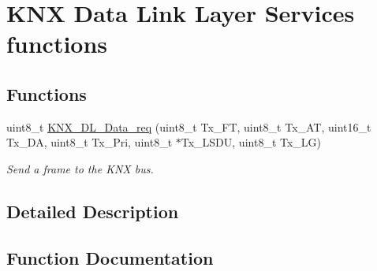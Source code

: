 \hypertarget{group___k_n_x___d_l___exported___functions___group2}{}\section{K\+NX Data Link Layer Services functions}
\label{group___k_n_x___d_l___exported___functions___group2}
\subsection*{Functions}
\begin{DoxyCompactItemize}
\item 
uint8\+\_\+t \hyperlink{group___k_n_x___d_l___exported___functions___group2_ga92e01d8fd06b0e629413b1b2316d88df}{K\+N\+X\+\_\+\+D\+L\+\_\+\+Data\+\_\+req} (uint8\+\_\+t Tx\+\_\+\+FT, uint8\+\_\+t Tx\+\_\+\+AT, uint16\+\_\+t Tx\+\_\+\+DA, uint8\+\_\+t Tx\+\_\+\+Pri, uint8\+\_\+t $\ast$Tx\+\_\+\+L\+S\+DU, uint8\+\_\+t Tx\+\_\+\+LG)
\begin{DoxyCompactList}\small\item\em Send a frame to the K\+NX bus. \end{DoxyCompactList}\end{DoxyCompactItemize}


\subsection{Detailed Description}


\subsection{Function Documentation}
